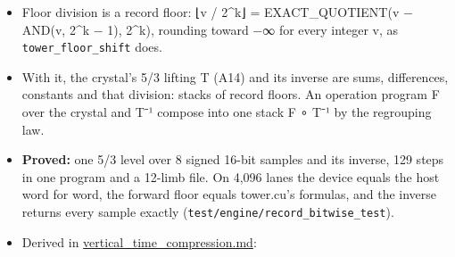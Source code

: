 \begin{itemize}
\begin{itemize}
\item Floor division is a record floor: ⌊v / 2\textasciicircum{}k⌋ = EXACT\_\allowbreak{}QUOTIENT(v − AND(v, 2\textasciicircum{}k − 1), 2\textasciicircum{}k), rounding toward −∞ for every integer v, as \texttt{tower\_\allowbreak{}floor\_\allowbreak{}shift} does.
\item With it, the crystal's 5/3 lifting T (A14) and its inverse are sums, differences, constants and that division: stacks of record floors. An operation program F over the crystal and T⁻¹ compose into one stack F ∘ T⁻¹ by the regrouping law.
\item \textbf{Proved:} one 5/3 level over 8 signed 16-bit samples and its inverse, 129 steps in one program and a 12-limb file. On 4,096 lanes the device equals the host word for word, the forward floor equals tower.cu's formulas, and the inverse returns every sample exactly (\texttt{test/\allowbreak{}engine/\allowbreak{}record\_\allowbreak{}bitwise\_\allowbreak{}test}).
\item Derived in \hyperref[chap:vertical-time-compression]{vertical\_\allowbreak{}time\_\allowbreak{}compression.md}:


\end{itemize}
\end{itemize}
